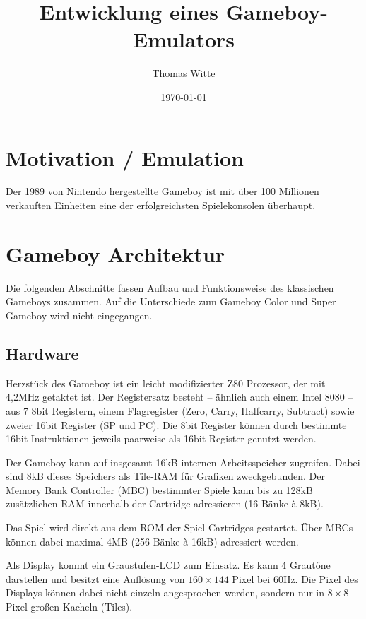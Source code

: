 \documentclass[a4paper]{scrartcl}
\title{Entwicklung eines Gameboy-Emulators}
\author{Thomas Witte}
\date{\today}
\begin{document}
\maketitle

\section{Motivation / Emulation}

Der 1989 von Nintendo hergestellte Gameboy ist mit über 100 Millionen verkauften Einheiten eine der erfolgreichsten Spielekonsolen überhaupt.
\section{Gameboy Architektur}

Die folgenden Abschnitte fassen Aufbau und Funktionsweise des klassischen Gameboys zusammen. Auf die Unterschiede zum Gameboy Color und Super Gameboy wird nicht eingegangen.

\subsection{Hardware}

Herzstück des Gameboy ist ein leicht modifizierter Z80 Prozessor, der mit 4,2MHz getaktet ist. Der Registersatz besteht -- ähnlich auch einem Intel 8080 -- aus 7 8bit Registern, einem Flagregister (Zero, Carry, Halfcarry, Subtract) sowie zweier 16bit Register (SP und PC). Die 8bit Register können durch bestimmte 16bit Instruktionen jeweils paarweise als 16bit Register genutzt werden.

Der Gameboy kann auf insgesamt 16kB internen Arbeitsspeicher zugreifen. Dabei sind 8kB dieses Speichers als Tile-RAM für Grafiken zweckgebunden. Der Memory Bank Controller (MBC) bestimmter Spiele kann bis zu 128kB zusätzlichen RAM innerhalb der Cartridge adressieren (16 Bänke à 8kB).

Das Spiel wird direkt aus dem ROM der Spiel-Cartridges gestartet. Über MBCs können dabei maximal 4MB (256 Bänke à 16kB) adressiert werden.

Als Display kommt ein Graustufen-LCD zum Einsatz. Es kann 4 Grautöne darstellen und besitzt eine Auflösung von $160 \times 144$ Pixel bei 60Hz. Die Pixel des Displays können dabei nicht einzeln angesprochen werden, sondern nur in $8 \times 8$ Pixel großen Kacheln (Tiles).
\end{document}
